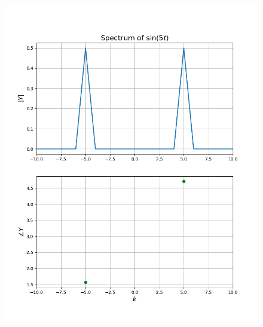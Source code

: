 \documentclass[12pt, a4paper]{article}
\begin{document}
\begin{figure}[H]
    \centering
    \includegraphics[scale=0.6]{eg2.png}
\end{figure}
\end{document}
